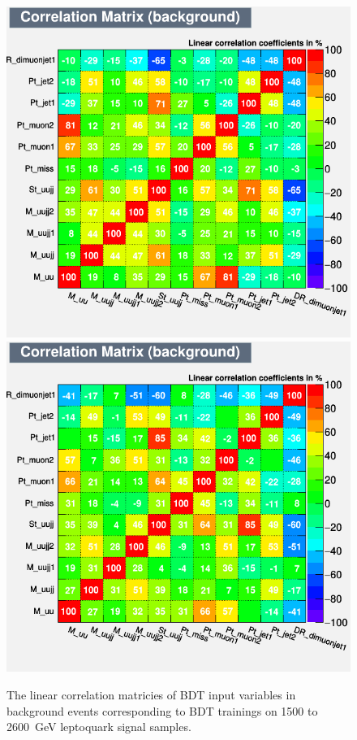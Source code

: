 \begin{figure}[H]
    {\includegraphics[width=.30\textwidth]{Images/Analysis/Results_LQToBMu_pair_uubj_BDTG_FullRun2_2023_01_25_020318/2500/CorrelationMatrixB.png}}
    {\includegraphics[width=.30\textwidth]{Images/Analysis/Results_LQToBMu_pair_uubj_BDTG_FullRun2_2023_01_25_020318/2600/CorrelationMatrixB.png}}
    \caption{The linear correlation matricies of BDT input variables in background events corresponding to BDT trainings on 1500 to \SI{2600}{GeV} leptoquark signal samples.}
    \label{figapp:correlationsBkg2}
\end{figure}


